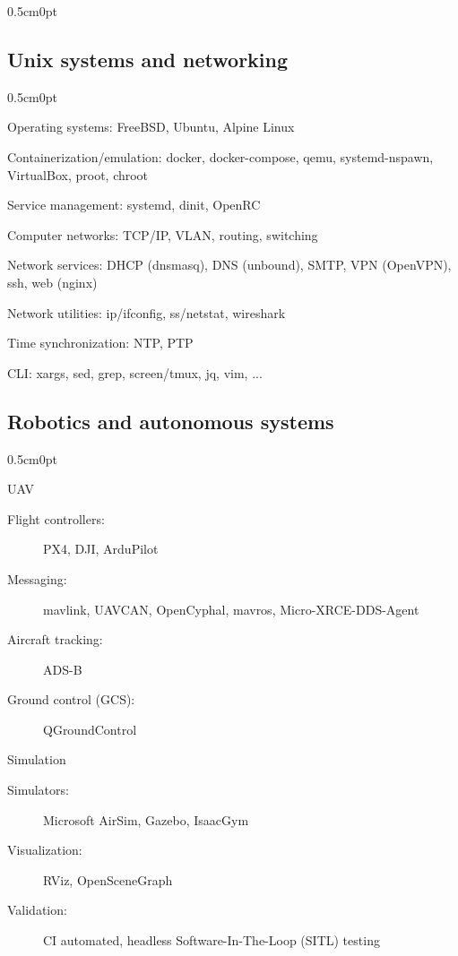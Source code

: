 \documentclass[a4paper,10pt]{report}
\newenvironment{cvindent}{\begin{adjustwidth}{0.5cm}{0pt}}{\end{adjustwidth}}
\newenvironment{cvdescription}[1][]{\begin{cvindent}\begin{description}[#1]}{\end{description}\end{cvindent}}
\begin{document}
\begin{cvindent}
\subsection{Unix systems and networking}
\begin{cvdescription}
    \item[Operating systems:]          FreeBSD, Ubuntu, Alpine Linux
    \item[Containerization/emulation:] docker, docker-compose, qemu, systemd-nspawn, VirtualBox, proot, chroot
    \item[Service management:]         systemd, dinit, OpenRC
    \item[Computer networks:]          TCP/IP, VLAN, routing, switching
    \item[Network services:]           DHCP (dnsmasq), DNS (unbound), SMTP, VPN (OpenVPN), ssh, web (nginx)
    \item[Network utilities:]          ip/ifconfig, ss/netstat, wireshark
    \item[Time synchronization:]       NTP, PTP
    \item[CLI:]                        xargs, sed, grep, screen/tmux, jq, vim, ...
\end{cvdescription}

\subsection{Robotics and autonomous systems}
\begin{cvdescription}
    \item[UAV] \leavevmode
        \begin{description}
            \item[Flight controllers:]   PX4, DJI, ArduPilot
            \item[Messaging:]            mavlink, UAVCAN, OpenCyphal, mavros, Micro-XRCE-DDS-Agent
            \item[Aircraft tracking:]    ADS-B
            \item[Ground control (GCS):] QGroundControl
        \end{description}

    \item[Simulation] \leavevmode
        \begin{description}
            \item[Simulators:]    Microsoft AirSim, Gazebo, IsaacGym
            \item[Visualization:] RViz, OpenSceneGraph
            \item[Validation:]    CI automated, headless Software-In-The-Loop (SITL) testing
        \end{description}


\end{cvdescription}
\end{cvindent}
\end{document}
